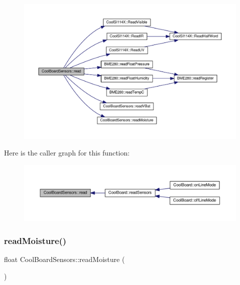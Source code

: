 \begin{figure}[H]
\begin{center}
\leavevmode
\includegraphics[width=350pt]{de/d46/class_cool_board_sensors_a91badb2539d91fda8679f2a597874c48_cgraph}
\end{center}
\end{figure}
Here is the caller graph for this function\+:\nopagebreak
\begin{figure}[H]
\begin{center}
\leavevmode
\includegraphics[width=350pt]{de/d46/class_cool_board_sensors_a91badb2539d91fda8679f2a597874c48_icgraph}
\end{center}
\end{figure}
\mbox{\label{class_cool_board_sensors_a8761bff50373c485f4465c8db47d0633}} 
\subsubsection{\texorpdfstring{read\+Moisture()}{readMoisture()}}
{\footnotesize\ttfamily float Cool\+Board\+Sensors\+::read\+Moisture (\begin{DoxyParamCaption}{ }\end{DoxyParamCaption})}

